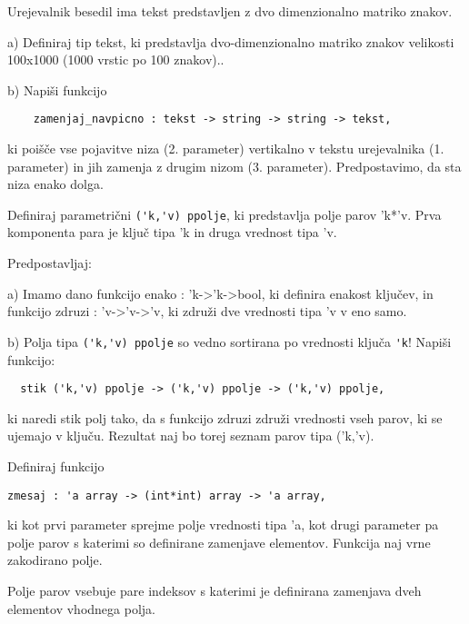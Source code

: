 \begin{ex}
  Urejevalnik besedil ima tekst predstavljen z dvo dimenzionalno
  matriko znakov.

  a) Definiraj tip tekst, ki predstavlja dvo-dimenzionalno matriko
  znakov velikosti 100x1000 (1000 vrstic po 100 znakov)..

  b) Napi\v si funkcijo

\begin{lstlisting}
    zamenjaj_navpicno : tekst -> string -> string -> tekst, 
\end{lstlisting}
  ki poi\v s\v ce vse pojavitve niza (2. parameter) vertikalno v
  tekstu urejevalnika (1. parameter) in jih zamenja z drugim nizom
  (3. parameter). Predpostavimo, da sta niza enako dolga.
\end{ex} 




\begin{ex}
  Definiraj parametri\v cni \lstinline{('k,'v) ppolje}, ki predstavlja
  polje parov 'k*'v. Prva komponenta para je klju\v c tipa 'k in druga
  vrednost tipa 'v.

  \noindent\/Predpostavljaj:

  a) Imamo dano funkcijo enako : 'k->'k->bool, ki definira enakost
  klju\v cev, in funkcijo zdruzi : 'v->'v->'v, ki zdru\v zi dve
  vrednosti tipa 'v v eno samo.

  b) Polja tipa \lstinline{('k,'v) ppolje} so vedno sortirana po vrednosti klju\v
  ca \lstinline{'k}!  Napi\v si funkcijo:
\begin{lstlisting}
  stik ('k,'v) ppolje -> ('k,'v) ppolje -> ('k,'v) ppolje,
\end{lstlisting}
  ki naredi stik polj tako, da s funkcijo zdruzi zdru\v zi vrednosti
  vseh parov, ki se ujemajo v klju\v cu. Rezultat naj bo torej seznam
  parov tipa ('k,'v).
\end{ex}




\begin{ex}
Definiraj funkcijo 
\begin{lstlisting}
zmesaj : 'a array -> (int*int) array -> 'a array, 
\end{lstlisting}
ki kot prvi parameter sprejme polje vrednosti tipa 'a, kot drugi parameter pa polje parov s katerimi so definirane zamenjave elementov. Funkcija naj vrne zakodirano polje. 

Polje parov vsebuje pare indeksov s katerimi je definirana zamenjava dveh elementov vhodnega polja. 
\end{ex} 




